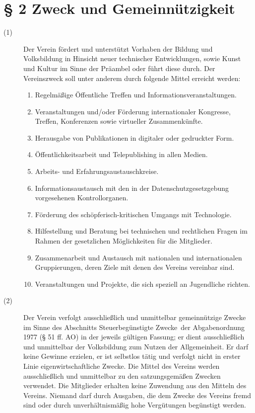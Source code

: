 \documentclass[12pt,paper=a4,ngerman]{scrreprt}
\begin{document}
\section{\S{} 2 Zweck und Gemeinnützigkeit}
\begin{description}
	\item[(1)] Der Verein fördert und unterstützt Vorhaben der Bildung und Volksbildung in Hinsicht neuer technischer Entwicklungen, sowie Kunst und Kultur im Sinne der Präambel oder führt diese durch. Der Vereinszweck soll unter anderem durch folgende Mittel erreicht werden:
	\begin{enumerate}
		\item Regelmäßige Öffentliche Treffen und Informationsveranstaltungen.
		\item Veranstaltungen und/oder Förderung internationaler Kongresse, Treffen, Konferenzen sowie virtueller Zusammenkünfte.
		\item Herausgabe von Publikationen in digitaler oder gedruckter Form.
		\item Öffentlichkeitsarbeit und Telepublishing in allen Medien.
		\item Arbeits- und Erfahrungsaustauschkreise.
		\item Informationsaustausch mit den in der Datenschutzgesetzgebung vorgesehenen Kontrollorganen.
		\item Förderung des schöpferisch-kritischen Umgangs mit Technologie.
		\item Hilfestellung und Beratung bei technischen und rechtlichen Fragen im Rahmen der gesetzlichen Möglichkeiten für die Mitglieder.
		\item Zusammenarbeit und Austausch mit nationalen und internationalen Gruppierungen, deren Ziele mit denen des Vereins vereinbar sind.
		\item Veranstaltungen und Projekte, die sich speziell an Jugendliche richten.
	\end{enumerate}
\item[(2)] Der Verein verfolgt ausschließlich und unmittelbar gemeinnützige Zwecke im Sinne des Abschnitts \glqq Steuerbegünstigte Zwecke\grqq ~der Abgabenordnung 1977 (§ 51 ff. AO) in der jeweils gültigen Fassung; er dient ausschließlich und unmittelbar der Volksbildung zum Nutzen der Allgemeinheit. Er darf keine Gewinne erzielen, er ist selbstlos tätig und verfolgt nicht in erster Linie eigenwirtschaftliche Zwecke. Die Mittel des Vereins werden ausschließlich und unmittelbar zu den satzungsgemäßen Zwecken verwendet. Die Mitglieder erhalten keine Zuwendung aus den Mitteln des Vereins. Niemand darf durch Ausgaben, die dem Zwecke des Vereins fremd sind oder durch unverhältnismäßig hohe Vergütungen begünstigt werden.
\end{description}
\end{document}
